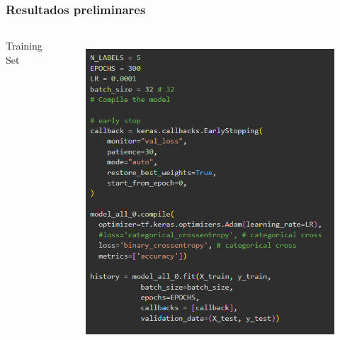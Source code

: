 \documentclass[aspectratio=169]{beamer}
\begin{document}
\begin{frame}
\begin{columns}
    \end{columns}




\end{frame}










\begin{frame}
    \frametitle{Resultados preliminares}

    \begin{columns}



        \centering
        Training Set

        \begin{figure}
            \centering
            \includegraphics[scale = 0.4]{img/trainingSet.png}
            \label{fig:enter-label}
        \end{figure}




\end{columns}
\end{frame}
\end{document}
